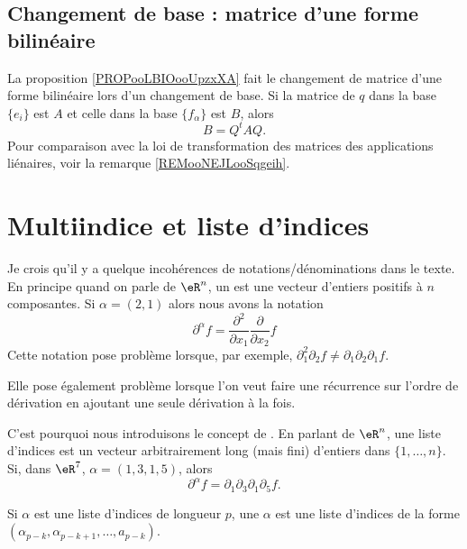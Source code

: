 \subsection{Changement de base : matrice d'une forme bilinéaire}

La proposition \ref{PROPooLBIOooUpzxXA} fait le changement de matrice d'une forme bilinéaire lors d'un changement de base. Si la matrice de \( q\) dans la base \( \{ e_i \}\) est \( A\) et celle dans la base \( \{ f_{\alpha} \}\) est \( B\), alors
\begin{equation}
    B=Q^tAQ.
\end{equation}
Pour comparaison avec la loi de transformation des matrices des applications liénaires, voir la remarque \ref{REMooNEJLooSqgeih}.

\section{Multiindice et liste d'indices}

\begin{normaltext}      \label{NORMooRRZCooMOKAzY}
    Je crois qu'il y a quelque incohérences de notations/dénominations dans le texte\cite{MonCerveau}. En principe quand on parle de \( \eR^n\), un  \cite{BIBooYDMJooGDtdbo} est une vecteur d'entiers positifs à \( n\) composantes. Si \( \alpha=(2,1)\) alors nous avons la notation
    \begin{equation}
        \partial^{\alpha}f=\frac{ \partial^2  }{ \partial x_1 }\frac{ \partial  }{ \partial x_2 }f
    \end{equation}
    Cette notation pose problème lorsque, par exemple, \( \partial_1^2\partial_2f\neq \partial_1\partial_2\partial_1f\).

    Elle pose également problème lorsque l'on veut faire une récurrence sur l'ordre de dérivation en ajoutant une seule dérivation à la fois.

    C'est pourquoi nous introduisons le concept de . En parlant de \( \eR^n\), une liste d'indices est un vecteur arbitrairement long (mais fini) d'entiers dans \( \{ 1,\ldots, n \}\). Si, dans \( \eR^7\), \( \alpha=(1,3,1,5)\), alors
    \begin{equation}
        \partial^{\alpha}f=\partial_1\partial_3\partial_1\partial_5f.
    \end{equation}

    Si \( \alpha\) est une liste d'indices de longueur \( p\), une  \( \alpha\) est une liste d'indices de la forme \( (\alpha_{p-k}, \alpha_{p-k+1},\ldots, a_{p-k})\).
\end{normaltext}
